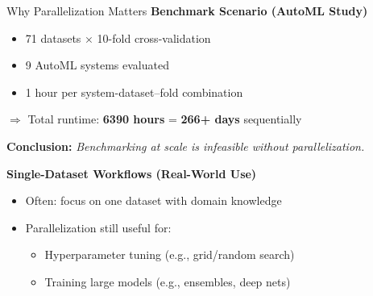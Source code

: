 \documentclass[11pt,compress,t,notes=noshow, xcolor=table]{beamer}
\begin{document}
\begin{vbframe}{Why Parallelization Matters}
\vfill
\textbf{Benchmark Scenario (AutoML Study)}
\begin{itemize}
    \item 71 datasets $\times$ 10-fold cross-validation
    \item 9 AutoML systems evaluated
    \item 1 hour per system-dataset–fold combination
\end{itemize}
$\Rightarrow$ Total runtime: \textbf{6390 hours} = \textbf{266+ days} sequentially

\vspace{1em}
\textbf{Conclusion:} \textit{Benchmarking at scale is infeasible without parallelization.}

\vfill
\pause
\textbf{Single-Dataset Workflows (Real-World Use)}
\begin{itemize}
    \item Often: focus on one dataset with domain knowledge
    \item Parallelization still useful for:
    \begin{itemize}
        \item Hyperparameter tuning (e.g., grid/random search)
        \item Training large models (e.g., ensembles, deep nets)
    \end{itemize}
\end{itemize}
\vfill
\end{vbframe}



\endlecture
\end{document}
